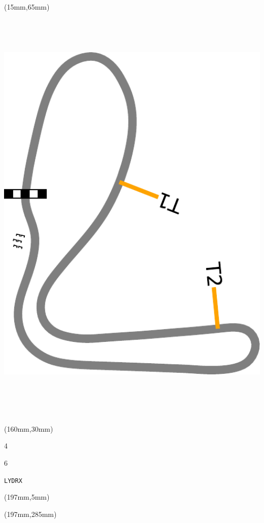 \begin{textblock*}{185mm}(15mm,65mm)%
\centering
\mbox{\includegraphics[width=185mm,height=210mm,keepaspectratio]{PT/LYDRX.pdf}}
\end{textblock*}
\begin{textblock*}{40mm}(160mm,30mm)%
\Large
\par{} 
\par4 
\par6 
\par\hfill\tiny\tt LYDRX\\
\end{textblock*}
\begin{textblock*}{20mm}(197mm,5mm)%
\fbox{\thepage}
\label{LYDRX}
\end{textblock*}
\begin{textblock*}{20mm}(197mm,285mm)%
\fbox{\thepage}
\end{textblock*}

